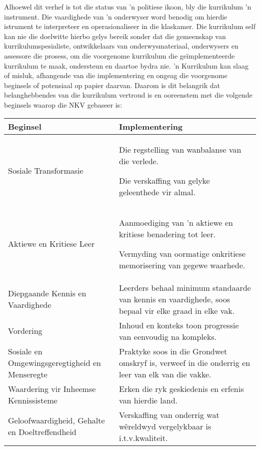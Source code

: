 Alhoewel dit verhef is tot die status van 'n politiese ikoon, bly die
kurrikulum 'n instrument. Die vaardighede van 'n onderwyser word
benodig om hierdie istrument te interpreteer en operasionaliseer in
die klaskamer.
Die kurrikulum self kan nie die doelwitte hierbo gelys bereik sonder
dat die gemeenskap van kurrikulumspesialiste, ontwikkelaars van
onderwysmateriaal, onderwysers en assessore die prosess, om die
voorgenome kurrikulum die ge\"{i}mplementeerde kurrikulum te maak,
ondersteun en daartoe bydra nie.
'n Kurrikulum kan slaag of misluk, afhangende van die implementering
en ongeag die voorgenome beginsels of potensiaal op papier daarvan.
Daarom is dit belangrik dat belanghebbendes van die kurrikulum
vertroud is en ooreenstem met die volgende beginsels waarop die NKV
gebaseer is:

\begin{table}[H]
\begin{center}
\begin{tabular}{|p{6.5cm}|p{6.5cm}|} \hline
\textbf{Beginsel} &
\textbf{Implementering} \\ \hline
Sosiale Transformasie &
Die regstelling van wanbalanse van die verlede.\par
Die verskaffing van gelyke geleenthede vir almal.\\ \hline
Aktiewe en Kritiese Leer &
Aanmoediging van 'n aktiewe en kritiese benadering tot leer.\par
Vermyding van oormatige onkritiese memorisering van gegewe waarhede.\\ \hline
Diepgaande Kennis en Vaardighede &
Leerders behaal minimum standaarde van kennis en vaardighede, soos
bepaal vir elke graad in elke vak. \\ \hline
Vordering &
Inhoud en konteks toon progressie van eenvoudig na kompleks. \\ \hline
Sosiale en Omgewingsgeregtigheid en Menseregte &
Praktyke soos in die Grondwet omskryf is, verweef in die onderrig en
leer van elk van die vakke. \\ \hline
Waardering vir Inheemse Kennissisteme &
Erken die ryk geskiedenis en erfenis van hierdie land. \\ \hline
Geloofwaardigheid, Gehalte en Doeltreffendheid &
Verskaffing van onderrig wat wêreldwyd vergelykbaar is i.t.v.\@ kwaliteit. \\ \hline
\end{tabular}
\end{center}
\end{table}

